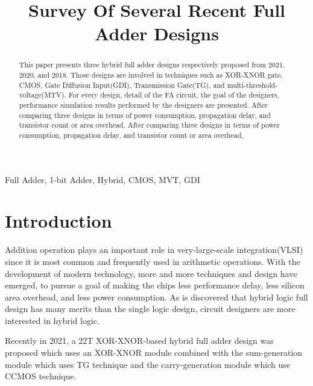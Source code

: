 \documentclass[conference]{IEEEtran}
\begin{document}
\title{Survey Of Several Recent Full Adder Designs}

\author{
}
\maketitle

\begin{abstract}
	This paper presents three hybrid full adder designs respectively proposed from 2021, 2020, and 2018.
	Those designs are involved in techniques such as XOR-XNOR gate, CMOS, Gate Diffusion Input(GDI), Transmission Gate(TG), and multi-threshold-voltage(MTV).
	For every design, detail of the FA circuit, the goal of the designers, performance simulation results performed by the designers are presented.
	After comparing three designs in terms of power consumption, propagation delay, and transistor count or area overhead,
	After comparing three designs in terms of power consumption, propagation delay, and transistor count or area overhead,
\end{abstract}

\begin{IEEEkeywords}
	Full Adder, 1-bit Adder, Hybrid, CMOS, MVT, GDI
\end{IEEEkeywords}

\section{Introduction}


Addition operation plays an important role in very-large-scale integration(VLSI) since it is most common and frequently used in arithmetic operations.
With the development of modern technology, more and more techniques and design have emerged,
to pursue a goal of making the chips less performance delay, less silicon area overhead, and less power consumption.
As is discovered that hybrid logic full design has many merits than the single logic design, circuit designers are more interested in hybrid logic.

Recently in 2021, a 22T XOR-XNOR-based hybrid full adder design \cite{20212210429416} was proposed
which uses an XOR-XNOR module combined with the sum-generation module which uses TG technique
and the carry-generation module which use CCMOS technique.
\end{document}
